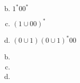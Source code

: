 \documentclass[../main.tex]{subfiles}
\begin{document}
\begin{enumerate}[a)]
	\setcounter{enumi}{1}
	\item {\boldmath $1^\ast00^\ast$}
	\setcounter{enumi}{3}
	\item {\boldmath $(1 \cup 00)^\ast$}
	\setcounter{enumi}{5}
	\item {\boldmath $(0 \cup 1)(0 \cup 1)^\ast00$}
\end{enumerate}

\solution
\begin{enumerate}[a)]
	\setcounter{enumi}{1}
	\item 
	\setcounter{enumi}{3}
	\item 
	\setcounter{enumi}{5}
	\item 
\end{enumerate}
\end{document}

